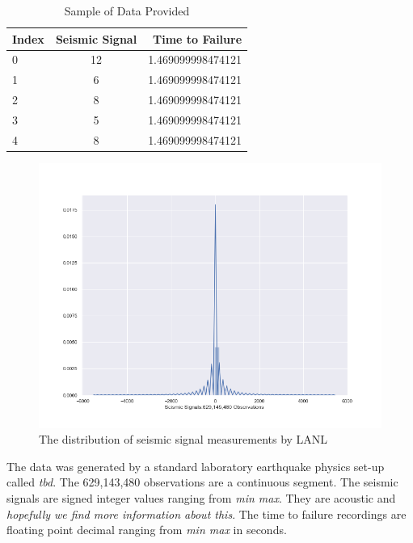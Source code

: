 \documentclass[]{llncs}
\begin{document}
\begin{table}[h!]
	\begin{center}
		\caption{Sample of Data Provided}
		\label{tab:table1}
		\begin{tabular}{l|c|r} %
			\textbf{Index} & \textbf{Seismic Signal} & \textbf{Time to Failure}\\
			\hline
			0 & 12 & 1.469099998474121 \\ 
			1 & 6 & 1.469099998474121 \\ 
			2 & 8 & 1.469099998474121 \\ 
			3 & 5 & 1.469099998474121 \\ 
			4 & 8 & 1.469099998474121 \\ 
		\end{tabular}
	\end{center}
\end{table}

\begin{figure}
	\centering
	\includegraphics[width=.8\linewidth]{../GPUProject/acousticRand60000DistPlot}
	\caption{The distribution of seismic signal measurements by LANL}
	\label{fig:acousticRand60000DistPlot}
\end{figure}

The data was generated by a standard laboratory earthquake physics set-up called {\em tbd}.  
The 629,143,480 observations are a continuous segment. The seismic signals are signed integer values ranging from {\em min max}. They are acoustic and {\em hopefully we find more information about this}. The time to failure recordings are floating point decimal ranging from {\em min max} in seconds. \par
\end{document}
